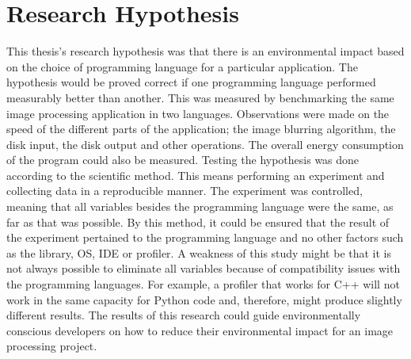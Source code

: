 \chapter{Research Hypothesis}
This thesis’s research hypothesis was that there is an environmental impact based on the choice of programming language for a particular application.
The hypothesis would be proved correct if one programming language performed measurably better than another. This was measured by benchmarking the same image processing application in two languages. Observations were made on the speed of the different parts of the application; the image blurring algorithm, the disk input, the disk output and other operations. The overall energy consumption of the program could also be measured.
Testing the hypothesis was done according to the scientific method. This means performing an experiment and collecting data in a reproducible manner. The experiment was controlled, meaning that all variables besides the programming language were the same, as far as that was possible. By this method, it could be ensured that the result of the experiment pertained to the programming language and no other factors such as the library, OS, IDE or profiler.
A weakness of this study might be that it is not always possible to eliminate all variables because of compatibility issues with the programming languages. For example, a profiler that works for C++ will not work in the same capacity for Python code and, therefore, might produce slightly different results.
The results of this research could guide environmentally conscious developers on how to reduce their environmental impact for an image processing project.
